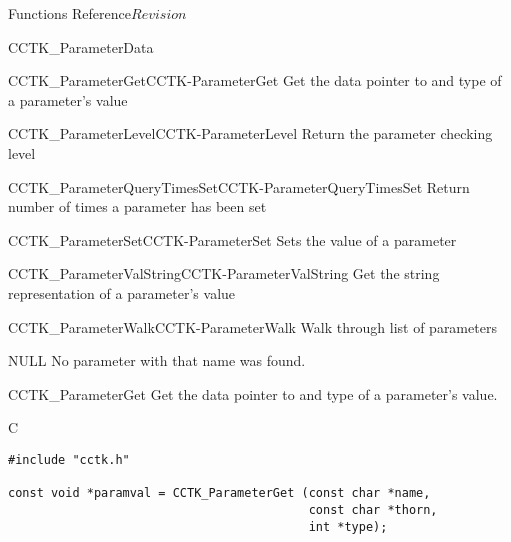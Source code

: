 \begin{cactuspart}{ Functions Reference}{}{$Revision$}
\begin{FunctionDescription}{CCTK\_ParameterData}
\begin{SeeAlsoSection}
\begin{SeeAlso2}{CCTK\_ParameterGet}{CCTK-ParameterGet}
  Get the data pointer to and type of a parameter's value
\end{SeeAlso2}
\begin{SeeAlso2}{CCTK\_ParameterLevel}{CCTK-ParameterLevel}
  Return the parameter checking level
\end{SeeAlso2}
\begin{SeeAlso2}{CCTK\_ParameterQueryTimesSet}{CCTK-ParameterQueryTimesSet}
  Return number of times a parameter has been set
\end{SeeAlso2}
\begin{SeeAlso2}{CCTK\_ParameterSet}{CCTK-ParameterSet}
  Sets the value of a parameter
\end{SeeAlso2}
\begin{SeeAlso2}{CCTK\_ParameterValString}{CCTK-ParameterValString}
  Get the string representation of a parameter's value
\end{SeeAlso2}
\begin{SeeAlso2}{CCTK\_ParameterWalk}{CCTK-ParameterWalk}
  Walk through list of parameters
\end{SeeAlso2}
\end{SeeAlsoSection}

\begin{ErrorSection}
\begin{Error}{NULL}
No parameter with that name was found.
\end{Error}
\end{ErrorSection}
\end{FunctionDescription}


\begin{FunctionDescription}{CCTK\_ParameterGet}
\label{CCTK-ParameterGet}
Get the data pointer to and type of a parameter's value.

\begin{SynopsisSection}
\begin{Synopsis}{C}
\begin{verbatim}
#include "cctk.h"

const void *paramval = CCTK_ParameterGet (const char *name,
                                          const char *thorn,
                                          int *type);
\end{verbatim}
\end{Synopsis}
\end{SynopsisSection}


\end{FunctionDescription}
\end{cactuspart}
